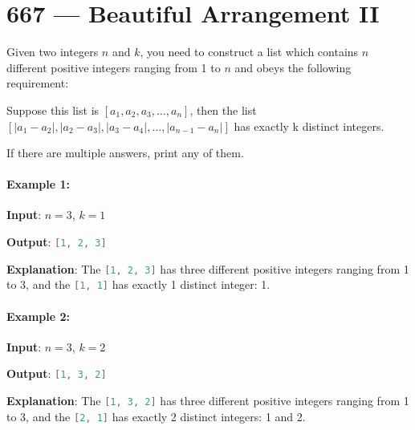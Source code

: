 \section{667 --- Beautiful Arrangement II}
Given two integers $n$ and $k$, you need to construct a list which contains $n$ different positive integers ranging from 1 to $n$ and obeys the following requirement:

Suppose this list is $[a_1, a_2, a_3, \ldots , a_n]$, then the list $[\lvert a_1 - a_2\rvert, \lvert a_2 - a_3\rvert, \lvert a_3 - a_4\rvert, \ldots , \lvert a_{n-1} - a_n\rvert]$ has exactly k distinct integers.

If there are multiple answers, print any of them.

\paragraph{Example 1:}

\begin{flushleft}
\textbf{Input}: $n = 3$, $k = 1$

\textbf{Output}: \lstinline[language=C++, basicstyle=\small\ttfamily, keywordstyle=\bfseries\color{green!40!black}]|[1, 2, 3]|

\textbf{Explanation}: The \lstinline[language=C++, basicstyle=\small\ttfamily, keywordstyle=\bfseries\color{green!40!black}]|[1, 2, 3]| has three different positive integers ranging from 1 to 3, and the \lstinline[language=C++, basicstyle=\small\ttfamily, keywordstyle=\bfseries\color{green!40!black}]|[1, 1]| has exactly 1 distinct integer: 1.
\end{flushleft}

\paragraph{Example 2:}

\begin{flushleft}
\textbf{Input}: $n = 3$, $k = 2$

\textbf{Output}: \lstinline[language=C++, basicstyle=\small\ttfamily, keywordstyle=\bfseries\color{green!40!black}]|[1, 3, 2]|

\textbf{Explanation}: The \lstinline[language=C++, basicstyle=\small\ttfamily, keywordstyle=\bfseries\color{green!40!black}]|[1, 3, 2]| has three different positive integers ranging from 1 to 3, and the \lstinline[language=C++, basicstyle=\small\ttfamily, keywordstyle=\bfseries\color{green!40!black}]|[2, 1]| has exactly 2 distinct integers: 1 and 2.
\end{flushleft}

